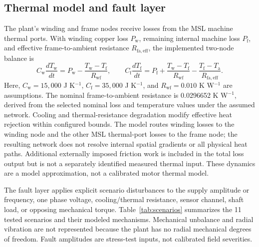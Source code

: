 \documentclass[machines,article,submit,moreauthors]{Definitions/mdpi}
\begin{document}
\subsection{Thermal model and fault layer}

The plant's winding and frame nodes receive losses from the MSL machine thermal ports. With winding copper loss $P_{\mathrm{w}}$, remaining internal machine loss $P_{\mathrm{f}}$, and effective frame-to-ambient resistance $R_{\mathrm{fa,eff}}$, the implemented two-node balance is
\begin{equation}
C_{\mathrm{w}}\frac{dT_{\mathrm{w}}}{dt}
=P_{\mathrm{w}}-\frac{T_{\mathrm{w}}-T_{\mathrm{f}}}{R_{\mathrm{wf}}},
\qquad
C_{\mathrm{f}}\frac{dT_{\mathrm{f}}}{dt}
=P_{\mathrm{f}}+\frac{T_{\mathrm{w}}-T_{\mathrm{f}}}{R_{\mathrm{wf}}}
-\frac{T_{\mathrm{f}}-T_{\mathrm{a}}}{R_{\mathrm{fa,eff}}}.
\label{eq:plantthermal}
\end{equation}
Here, $C_{\mathrm{w}}=15{,}000$ J K$^{-1}$, $C_{\mathrm{f}}=35{,}000$ J K$^{-1}$, and $R_{\mathrm{wf}}=0.010$ K W$^{-1}$ are assumptions. The nominal frame-to-ambient resistance is 0.0296652 K W$^{-1}$, derived from the selected nominal loss and temperature values under the assumed network. Cooling and thermal-resistance degradation modify effective heat rejection within configured bounds. The model routes winding losses to the winding node and the other MSL thermal-port losses to the frame node; the resulting network does not resolve internal spatial gradients or all physical heat paths. Additional externally imposed friction work is included in the total loss output but is not a separately identified measured thermal input. These dynamics are a model approximation, not a calibrated motor thermal model.

The fault layer applies explicit scenario disturbances to the supply amplitude or frequency, one phase voltage, cooling/thermal resistance, sensor channel, shaft load, or opposing mechanical torque. Table~\ref{tab:scenarios} summarizes the 11 tested scenarios and their modeled mechanisms. Mechanical unbalance and radial vibration are not represented because the plant has no radial mechanical degrees of freedom. Fault amplitudes are stress-test inputs, not calibrated field severities.
\end{document}
